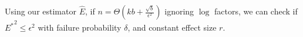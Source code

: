 \begin{theorem}
\label{thm:final-ours}
Using our estimator $\hat{E}$, if $n = \Theta(kb + \frac{\sqrt{b}}{\epsilon^2})$ ignoring $\log$ factors, we can check if ${E^*}^2  \leq \epsilon^2$ with failure probability $\delta$, and constant effect size $r$. 
\end{theorem}


